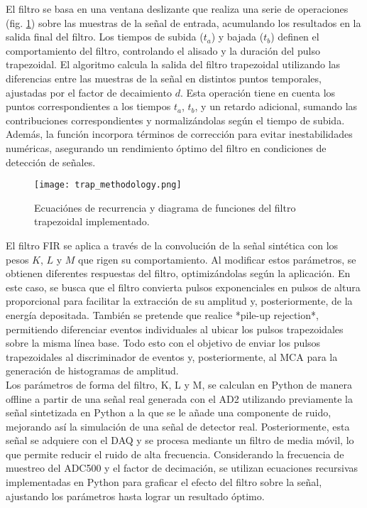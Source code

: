 \documentclass{report}
\begin{document}
\noindent El filtro se basa en una ventana deslizante que realiza una serie de operaciones (fig. \ref{fig:trapez_meth}) sobre las muestras de la señal de entrada, acumulando los resultados en la salida final del filtro. Los tiempos de subida (\( t_a \)) y bajada (\( t_b \)) definen el comportamiento del filtro, controlando el alisado y la duración del pulso trapezoidal. El algoritmo calcula la salida del filtro trapezoidal utilizando las diferencias entre las muestras de la señal en distintos puntos temporales, ajustadas por el factor de decaimiento \( d \). Esta operación tiene en cuenta los puntos correspondientes a los tiempos \( t_a \), \( t_b \), y un retardo adicional, sumando las contribuciones correspondientes y normalizándolas según el tiempo de subida. Además, la función incorpora términos de corrección para evitar inestabilidades numéricas, asegurando un rendimiento óptimo del filtro en condiciones de detección de señales.

\begin{figure}[H]
    \centering
    \texttt{[image: trap\_methodology.png]}
    \caption{Ecuaciónes de recurrencia y diagrama de funciones del filtro trapezoidal implementado.}
    \label{fig:trapez_meth}
\end{figure}

\noindent El filtro FIR se aplica a través de la convolución de la señal sintética con los pesos \( K \), \( L \) y \( M \) que rigen su comportamiento. Al modificar estos parámetros, se obtienen diferentes respuestas del filtro, optimizándolas según la aplicación. En este caso, se busca que el filtro convierta pulsos exponenciales en pulsos de altura proporcional para facilitar la extracción de su amplitud y, posteriormente, de la energía depositada. También se pretende que realice *pile-up rejection*, permitiendo diferenciar eventos individuales al ubicar los pulsos trapezoidales sobre la misma línea base. Todo esto con el objetivo de enviar los pulsos trapezoidales al discriminador de eventos y, posteriormente, al MCA para la generación de histogramas de amplitud.\\

\noindent Los parámetros de forma del filtro, K, L y M, se calculan en Python de manera offline a partir de una señal real generada con el AD2 utilizando previamente la señal sintetizada en Python a la que se le añade una componente de ruido, mejorando así la simulación de una señal de detector real. Posteriormente, esta señal se adquiere con el DAQ y se procesa mediante un filtro de media móvil, lo que permite reducir el ruido de alta frecuencia. Considerando la frecuencia de muestreo del ADC500 y el factor de decimación, se utilizan ecuaciones recursivas implementadas en Python para graficar el efecto del filtro sobre la señal, ajustando los parámetros hasta lograr un resultado óptimo.\\ 
\end{document}
